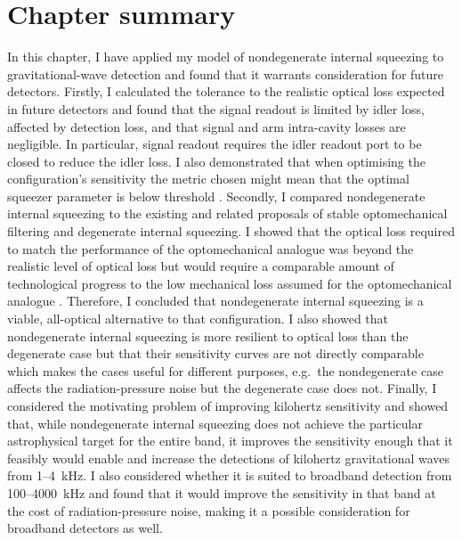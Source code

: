 \section{Chapter summary}

In this chapter, I have applied my model of nondegenerate internal squeezing to gravitational-wave detection and found that it warrants consideration for future detectors.
Firstly, I calculated the tolerance to the realistic optical loss expected in future detectors and found that the signal readout is limited by idler loss, affected by detection loss, and that signal and arm intra-cavity losses are negligible. In particular, signal readout requires the idler readout port to be closed to reduce the idler loss. I also demonstrated that when optimising the configuration's sensitivity the metric chosen might mean that the optimal squeezer parameter is below threshold .
Secondly, I compared nondegenerate internal squeezing to the existing and related proposals of stable optomechanical filtering and degenerate internal squeezing. I showed that the optical loss required to match the performance of the optomechanical analogue was beyond the realistic level of optical loss but would require a comparable amount of technological progress to the low mechanical loss assumed for the optomechanical analogue . Therefore, I concluded that nondegenerate internal squeezing is a viable, all-optical alternative to that configuration. I also showed that nondegenerate internal squeezing is more resilient to optical loss than the degenerate case but that their sensitivity curves are not directly comparable which makes the cases useful for different purposes, e.g.\ the nondegenerate case affects the radiation-pressure noise  but the degenerate case does not.
Finally, I considered the motivating problem of improving kilohertz sensitivity and showed that, while nondegenerate internal squeezing does not achieve the particular astrophysical target for the entire band, it improves the sensitivity enough that it feasibly would enable and increase the detections of kilohertz gravitational waves from 1--4~kHz. I also considered whether it is suited to broadband detection from 100--4000~kHz and found that it would improve the sensitivity in that band at the cost of radiation-pressure noise, making it a possible consideration for broadband detectors as well.




